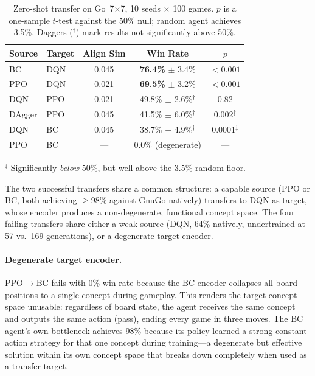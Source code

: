 \documentclass[11pt,a4paper]{article}
\begin{document}
\begin{table}[t]
\centering
\caption{Zero-shot transfer on Go~7$\times$7, 10 seeds $\times$ 100 games. $p$ is a one-sample $t$-test against the 50\% null; random agent achieves 3.5\%. Daggers ($^\dagger$) mark results not significantly above 50\%.}
\label{tab:agent_transfer}
\begin{tabular}{llccc}
\toprule
\textbf{Source} & \textbf{Target} & \textbf{Align Sim} & \textbf{Win Rate} & \textbf{$p$} \\
\midrule
BC  & DQN    & 0.045 & \textbf{76.4\%} $\pm$ 3.4\% & $< 0.001$ \\
PPO & DQN    & 0.021 & \textbf{69.5\%} $\pm$ 3.2\% & $< 0.001$ \\
DQN & PPO    & 0.021 & 49.8\% $\pm$ 2.6\%$^\dagger$ & 0.82 \\
DAgger & PPO & 0.045 & 41.5\% $\pm$ 6.0\%$^\dagger$ & 0.002$^\ddagger$ \\
DQN & BC     & 0.045 & 38.7\% $\pm$ 4.9\%$^\dagger$ & 0.0001$^\ddagger$ \\
PPO & BC     & ---   & 0.0\% (degenerate) & --- \\
\bottomrule
\end{tabular}
{\small $^\ddagger$ Significantly \emph{below} 50\%, but well above the 3.5\% random floor.}
\end{table}

The two successful transfers share a common structure: a capable source (PPO or BC, both achieving $\geq$98\% against GnuGo natively) transfers to DQN as target, whose encoder produces a non-degenerate, functional concept space. The four failing transfers share either a weak source (DQN, 64\% natively, undertrained at 57 vs.\ 169 generations), or a degenerate target encoder.

\paragraph{Degenerate target encoder.} PPO$\to$BC fails with 0\% win rate because the BC encoder collapses all board positions to a single concept during gameplay. This renders the target concept space unusable: regardless of board state, the agent receives the same concept and outputs the same action (pass), ending every game in three moves. The BC agent's own bottleneck achieves 98\% because its policy learned a strong constant-action strategy for that one concept during training---a degenerate but effective solution within its own concept space that breaks down completely when used as a transfer target.
\end{document}
